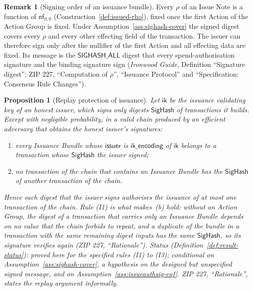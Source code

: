 \documentclass[11pt,a4paper]{article}
\newtheorem{proposition}[theorem]{Proposition}
\theoremstyle{definition}
\newtheorem{remark}[theorem]{Remark}
\newcommand{\nfsym}{\mathsf{nf}}
\begin{document}
\begin{remark}[Signing order of an issuance bundle]\label{rem:signing-order}
Every $\rho$ of an Issue Note is a function of $\nfsym_{0,0}$
(Construction~\ref{def:issued-rho}), fixed once the first Action of the
Action Group is fixed. Under Assumption~\ref{ass:sighash-cover} the signed
digest covers every $\rho$ and every other effecting field of the
transaction. The issuer can therefore sign only after the nullifier of the
first Action and all effecting data are fixed. Its message is the
$\mathsf{SIGHASH\_ALL}$ digest that every spend-authorisation signature and
the binding signature sign (\emph{Ironwood Guide}, Definition ``Signature
digest''; ZIP 227, ``Computation of $\rho$'', ``Issuance Protocol'' and
``Specification: Consensus Rule Changes'').
\end{remark}

\begin{proposition}[Replay protection of issuance]\label{prop:issue-replay}
Let $\mathsf{ik}$ be the issuance validating key of an honest issuer, which
signs only digests $\mathsf{SigHash}$ of transactions it builds. Except
with negligible probability, in a valid chain produced by an efficient
adversary that obtains the honest issuer's signatures:
\begin{enumerate}
\item[(a)] every Issuance Bundle whose $\mathsf{issuer}$ is
  $\mathsf{ik\_encoding}$ of $\mathsf{ik}$ belongs to a transaction whose
  $\mathsf{SigHash}$ the issuer signed;
\item[(b)] no transaction of the chain that contains an Issuance Bundle has
  the $\mathsf{SigHash}$ of another transaction of the chain.
\end{enumerate}
Hence each digest that the issuer signs authorises the issuance of at most
one transaction of the chain. Rule (I1) is what makes~(b) hold: without an
Action Group, the digest of a transaction that carries only an Issuance
Bundle depends on no value that the chain forbids to repeat, and a
duplicate of the bundle in a transaction with the same remaining digest
inputs has the same $\mathsf{SigHash}$, so its signature verifies again
(ZIP 227, ``Rationale''). Status (Definition~\ref{def:result-status}):
proved here for the specified rules (I1) to (I3); conditional on
Assumption~\ref{ass:sighash-cover}, a hypothesis on the designed but
unspecified signed message, and on
Assumption~\ref{ass:issueauthsig-euf}. ZIP 227, ``Rationale'', states the
replay argument informally.
\end{proposition}
\end{document}
